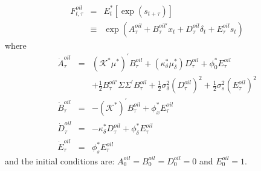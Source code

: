 \documentclass{article}
\begin{document}
\begin{eqnarray*}
F_{t,\tau }^{oil} &=&E_{t}^{\ast }\left[ \exp \left( s_{t+\tau }\right) %
\right]  \\
&\equiv &\exp \left( A_{\tau }^{oil}+B_{\tau }^{oil\prime }x_{t}+D_{\tau
}^{oil}\delta _{t}+E_{\tau }^{oil}s_{t}\right) 
\end{eqnarray*}%
where%
\begin{eqnarray*}
\dot{A}_{\tau }^{oil} &=&\left( \mathcal{K}^{\ast }\mu ^{\ast }\right)
^{\prime }B_{\tau }^{oil}+\left( \kappa _{\delta }^{\ast }\mu _{\delta
}^{\ast }\right) D_{\tau }^{oil}+\phi _{0}^{\ast }E_{\tau }^{oil} \\
&&+\frac{1}{2}B_{\tau }^{oil\prime }\Sigma \Sigma ^{\prime }B_{\tau }^{oil}+%
\frac{1}{2}\sigma _{\delta }^{2}\left( D_{\tau }^{oil}\right) ^{2}+\frac{1}{2%
}\sigma _{s}^{2}\left( E_{\tau }^{oil}\right) ^{2} \\
\dot{B}_{\tau }^{oil} &=&-\left( \mathcal{K}^{\ast }\right) ^{\prime
}B_{\tau }^{oil}+\phi _{x}^{\ast }E_{\tau }^{oil} \\
\dot{D}_{\tau }^{oil} &=&-\kappa _{\delta }^{\ast }D_{\tau }^{oil}+\phi
_{\delta }^{\ast }E_{\tau }^{oil} \\
\dot{E}_{\tau }^{oil} &=&\phi _{s}^{\ast }E_{\tau }^{oil}
\end{eqnarray*}%
and the initial conditions are: $A_{0}^{oil}=B_{0}^{oil}=D_{0}^{oil}=0$ and $%
E_{0}^{oil}=1$.
\end{document}
